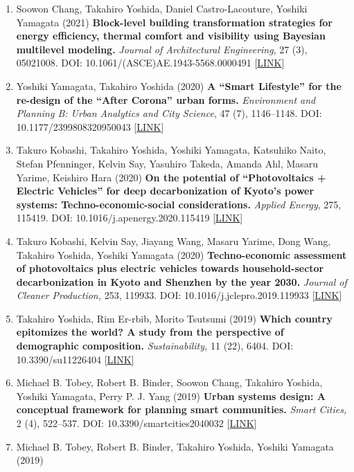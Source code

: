 \documentclass[]{book}
\begin{document}
\begin{enumerate}
\item
  Soowon Chang, Takahiro Yoshida, Daniel Castro-Lacouture, Yoshiki Yamagata (2021) \textbf{Block-level building transformation strategies for energy efficiency, thermal comfort and visibility using Bayesian multilevel modeling.}
  \emph{Journal of Architectural Engineering}, 27 (3), 05021008.
  DOI: 10.1061/(ASCE)AE.1943-5568.0000491 {[}\href{https://ascelibrary.org/doi/abs/10.1061/\%28ASCE\%29AE.1943-5568.0000491}{LINK}{]}
\item
  Yoshiki Yamagata, Takahiro Yoshida (2020)
  \textbf{A ``Smart Lifestyle'' for the re-design of the ``After Corona'' urban forms.}
  \emph{Environment and Planning B: Urban Analytics and City Science}, 47 (7), 1146--1148.
  DOI: 10.1177/2399808320950043 {[}\href{http://dx.doi.org/10.1177/2399808320950043}{LINK}{]}
\item
  Takuro Kobashi, Takahiro Yoshida, Yoshiki Yamagata, Katsuhiko Naito, Stefan Pfenninger, Kelvin Say, Yasuhiro Takeda, Amanda Ahl, Masaru Yarime, Keishiro Hara (2020)
  \textbf{On the potential of ``Photovoltaics + Electric Vehicles'' for deep decarbonization of Kyoto's power systems: Techno-economic-social considerations.}
  \emph{Applied Energy}, 275, 115419.
  DOI: 10.1016/j.apenergy.2020.115419 {[}\href{https://doi.org/10.1016/j.apenergy.2020.115419}{LINK}{]}
\item
  Takuro Kobashi, Kelvin Say, Jiayang Wang, Masaru Yarime, Dong Wang, Takahiro Yoshida, Yoshiki Yamagata (2020)
  \textbf{Techno-economic assessment of photovoltaics plus electric vehicles towards household-sector decarbonization in Kyoto and Shenzhen by the year 2030.}
  \emph{Journal of Cleaner Production,} 253, 119933.
  DOI: 10.1016/j.jclepro.2019.119933 {[}\href{https://doi.org/10.1016/j.jclepro.2019.119933}{LINK}{]}
\item
  Takahiro Yoshida, Rim Er-rbib, Morito Tsutsumi (2019)
  \textbf{Which country epitomizes the world? A study from the perspective of demographic composition.}
  \emph{Sustainability,} 11 (22), 6404.
  DOI: 10.3390/su11226404 {[}\href{https://www.mdpi.com/2071-1050/11/22/6404}{LINK}{]}
\item
  Michael B. Tobey, Robert B. Binder, Soowon Chang, Takahiro Yoshida, Yoshiki Yamagata, Perry P. J. Yang (2019)
  \textbf{Urban systems design: A conceptual framework for planning smart communities.}
  \emph{Smart Cities,} 2 (4), 522--537.
  DOI: 10.3390/smartcities2040032 {[}\href{https://www.mdpi.com/2624-6511/2/4/32}{LINK}{]}
\item
  Michael B. Tobey, Robert B. Binder, Takahiro Yoshida, Yoshiki Yamagata (2019)

\end{enumerate}
\end{document}
